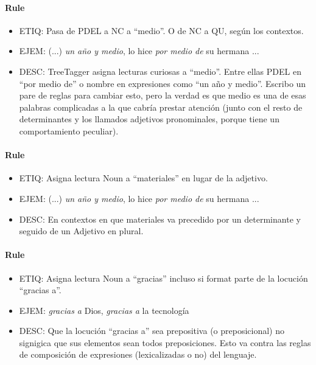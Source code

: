 \documentclass[11pt]{report}
\begin{document}
\paragraph*{Rule}
\begin{itemize}
\item ETIQ: Pasa de PDEL a NC a ``medio''. O de NC a QU, según los contextos.
\item EJEM: (...) \emph{un año y medio}, lo hice \emph{por medio de} su hermana ...
\item DESC: TreeTagger asigna lecturas curiosas a ``medio''. Entre ellas PDEL en ``por medio de'' o nombre en expresiones como ``un año y medio''. Escribo un pare de reglas para cambiar esto, pero la verdad es que medio es una de esas palabras complicadas a la que cabría prestar atención (junto con el resto de determinantes y los llamados adjetivos pronominales, porque tiene un comportamiento peculiar).
\end{itemize}

\paragraph*{Rule}
\begin{itemize}
\item ETIQ: Asigna lectura Noun a ``materiales'' en lugar de la adjetivo.
\item EJEM: (...) \emph{un año y medio}, lo hice \emph{por medio de} su hermana ...
\item DESC: En contextos en que materiales va precedido por un determinante y seguido de un Adjetivo en plural.
\end{itemize}

\paragraph*{Rule}
\begin{itemize}
\item ETIQ: Asigna lectura Noun a ``gracias'' incluso si format parte de la locución ``gracias a''.
\item EJEM: \emph{gracias a} Dios, \emph{gracias a} la tecnología
\item DESC: Que la locución ``gracias a'' sea prepositiva (o preposicional) no signigica que sus elementos sean todos preposiciones. Esto va contra las reglas de composición de expresiones (lexicalizadas o no) del lenguaje.
\end{itemize}
\end{document}
